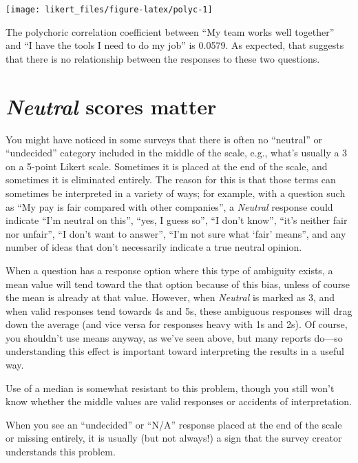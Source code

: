 \documentclass[]{book}
\begin{document}
\begin{center}\texttt{[image: likert\_files/figure-latex/polyc-1]} \end{center}

The polychoric correlation coefficient between ``My team works well
together'' and ``I have the tools I need to do my job'' is 0.0579. As
expected, that suggests that there is no relationship between the
responses to these two questions.

\chapter{\texorpdfstring{\emph{Neutral} scores
matter}{Neutral scores matter}}\label{neutral-scores-matter}

You might have noticed in some surveys that there is often no
``neutral'' or ``undecided'' category included in the middle of the
scale, e.g., what's usually a 3 on a 5-point Likert scale. Sometimes it
is placed at the end of the scale, and sometimes it is eliminated
entirely. The reason for this is that those terms can sometimes be
interpreted in a variety of ways; for example, with a question such as
``My pay is fair compared with other companies'', a \emph{Neutral}
response could indicate ``I'm neutral on this'', ``yes, I guess so'',
``I don't know'', ``it's neither fair nor unfair'', ``I don't want to
answer'', ``I'm not sure what `fair' means'', and any number of ideas
that don't necessarily indicate a true neutral opinion.

When a question has a response option where this type of ambiguity
exists, a mean value will tend toward the that option because of this
bias, unless of course the mean is already at that value. However, when
\emph{Neutral} is marked as 3, and when valid responses tend towards 4s
and 5s, these ambiguous responses will drag down the average (and vice
versa for responses heavy with 1s and 2s). Of course, you shouldn't use
means anyway, as we've seen above, but many reports do---so
understanding this effect is important toward interpreting the results
in a useful way.

Use of a median is somewhat resistant to this problem, though you still
won't know whether the middle values are valid responses or accidents of
interpretation.

When you see an ``undecided'' or ``N/A'' response placed at the end of
the scale or missing entirely, it is usually (but not always!) a sign
that the survey creator understands this problem.
\end{document}
